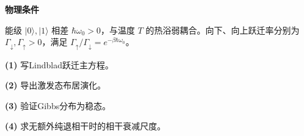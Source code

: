 \textbf{物理条件}\par 能级 \(|0\rangle,|1\rangle\) 相差 \(\hbar\omega_0>0\)，与温度 \(T\) 的热浴弱耦合。向下、向上跃迁率分别为 \(\Gamma_\downarrow,\Gamma_\uparrow>0\)，满足 \(\Gamma_\uparrow/\Gamma_\downarrow=e^{-\beta\hbar\omega_0}\)。
\par\noindent\textbf{(1)} 写Lindblad跃迁主方程。
\par\noindent\textbf{(2)} 导出激发态布居演化。
\par\noindent\textbf{(3)} 验证Gibbs分布为稳态。
\par\noindent\textbf{(4)} 求无额外纯退相干时的相干衰减尺度。
